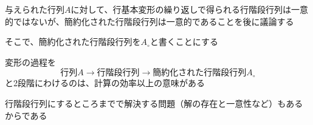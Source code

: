 \documentclass[../../../topic_linear-algebra]{subfiles}
\begin{document}
\br

与えられた行列$A$に対して、行基本変形の繰り返しで得られる行階段行列は一意的ではないが、簡約化された行階段行列は一意的であることを後に議論する

そこで、簡約化された行階段行列を$A_\circ$と書くことにする

\sectionline

変形の過程を
\begin{equation*}
  \text{行列}A \rightarrow \text{行階段行列} \rightarrow \text{簡約化された行階段行列}A_\circ
\end{equation*}
と2段階にわけるのは、計算の効率以上の意味がある

行階段行列にするところまでで解決する問題（解の存在と一意性など）もあるからである
\end{document}
